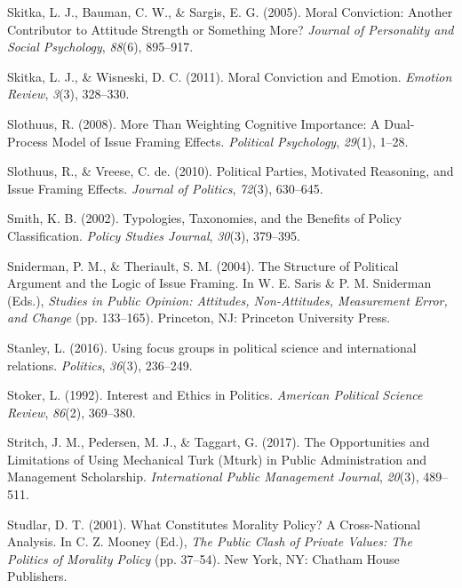 \documentclass[12pt,econ]{sources/authesis}
\begin{document}
\leavevmode\hypertarget{ref-skitka_moral_2005}{}%
Skitka, L. J., Bauman, C. W., \& Sargis, E. G. (2005). Moral Conviction: Another Contributor to Attitude Strength or Something More? \emph{Journal of Personality and Social Psychology}, \emph{88}(6), 895--917.

\leavevmode\hypertarget{ref-skitka_moral_2011}{}%
Skitka, L. J., \& Wisneski, D. C. (2011). Moral Conviction and Emotion. \emph{Emotion Review}, \emph{3}(3), 328--330.

\leavevmode\hypertarget{ref-slothuus_more_2008}{}%
Slothuus, R. (2008). More Than Weighting Cognitive Importance: A Dual-Process Model of Issue Framing Effects. \emph{Political Psychology}, \emph{29}(1), 1--28.

\leavevmode\hypertarget{ref-slothuus_political_2010}{}%
Slothuus, R., \& Vreese, C. de. (2010). Political Parties, Motivated Reasoning, and Issue Framing Effects. \emph{Journal of Politics}, \emph{72}(3), 630--645.

\leavevmode\hypertarget{ref-smith_typologies_2002}{}%
Smith, K. B. (2002). Typologies, Taxonomies, and the Benefits of Policy Classification. \emph{Policy Studies Journal}, \emph{30}(3), 379--395.

\leavevmode\hypertarget{ref-sniderman_structure_2004}{}%
Sniderman, P. M., \& Theriault, S. M. (2004). The Structure of Political Argument and the Logic of Issue Framing. In W. E. Saris \& P. M. Sniderman (Eds.), \emph{Studies in Public Opinion: Attitudes, Non-Attitudes, Measurement Error, and Change} (pp. 133--165). Princeton, NJ: Princeton University Press.

\leavevmode\hypertarget{ref-stanley_2016_using}{}%
Stanley, L. (2016). Using focus groups in political science and international relations. \emph{Politics}, \emph{36}(3), 236--249.

\leavevmode\hypertarget{ref-stoker_1992_interest}{}%
Stoker, L. (1992). Interest and Ethics in Politics. \emph{American Political Science Review}, \emph{86}(2), 369--380.

\leavevmode\hypertarget{ref-stritch_2017_opportunities}{}%
Stritch, J. M., Pedersen, M. J., \& Taggart, G. (2017). The Opportunities and Limitations of Using Mechanical Turk (Mturk) in Public Administration and Management Scholarship. \emph{International Public Management Journal}, \emph{20}(3), 489--511.

\leavevmode\hypertarget{ref-studlar_2001_what}{}%
Studlar, D. T. (2001). What Constitutes Morality Policy? A Cross-National Analysis. In C. Z. Mooney (Ed.), \emph{The Public Clash of Private Values: The Politics of Morality Policy} (pp. 37--54). New York, NY: Chatham House Publishers.
\end{document}
